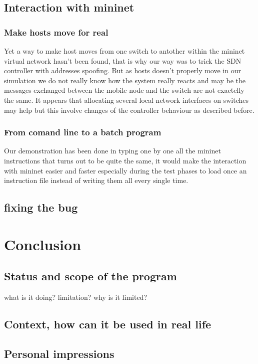 \documentclass{article}
\begin{document}
\subsection{Interaction with mininet}

\subsubsection{Make hosts move for real}
Yet a way to make host moves from one switch to antother within the
mininet virtual network hasn't been found, that is why our way was to
trick the SDN controller with addresses spoofing. But as hosts doesn't
properly move in our simulation we do not really know how the system
really reacts and may be the messages exchanged between the mobile
node and the switch are not exactelly the same. It appears that
allocating several local network interfaces on switches may help but
this involve changes of the controller behaviour as described
before.

\subsubsection{From comand line to a batch program}
Our demonstration has been done in typing one by one all the mininet
instructions that turns out to be quite the same, it would make the
interaction with mininet easier and faster especially during the test
phases to load once an instruction file instead of writing them all
every single time. 
 
\subsection{fixing the bug}

\section{Conclusion}

\subsection{Status and scope of the program}
what is it doing? limitation? why is it limited?

\subsection{Context, how can it be used in real life}
\subsection{Personal impressions}
\end{document}
